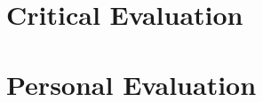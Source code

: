 \documentclass[10pt, a4paper]{article}
\begin{document}
 
 
 
 
 
 
 
 
 \section{Critical Evaluation}
 
 
 
 
 \section{Personal Evaluation}
\end{document}

